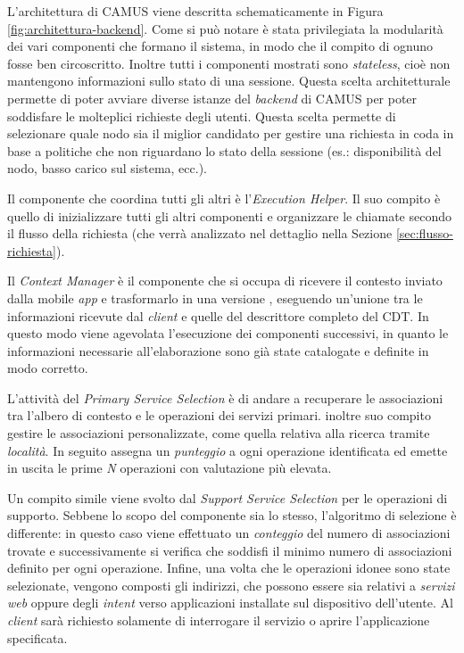 L'architettura di CAMUS viene descritta schematicamente in Figura \ref{fig:architettura-backend}. Come si può notare è stata privilegiata la modularità dei vari componenti che formano il sistema, in modo che il compito di ognuno fosse ben circoscritto. Inoltre tutti i componenti mostrati sono \emph{stateless}, cioè non mantengono informazioni sullo stato di una sessione. Questa scelta architetturale permette di poter avviare diverse istanze del \emph{backend} di CAMUS per poter soddisfare le molteplici richieste degli utenti. Questa scelta permette di selezionare quale nodo sia il miglior candidato per gestire una richiesta in coda in base a politiche che non riguardano lo stato della sessione (es.: disponibilità del nodo, basso carico sul sistema, ecc.).

Il componente che coordina tutti gli altri è l'\emph{Execution Helper}. Il suo compito è quello di inizializzare tutti gli altri componenti e organizzare le chiamate secondo il flusso della richiesta (che verrà analizzato nel dettaglio nella Sezione \ref{sec:flusso-richiesta}).

Il \emph{Context Manager} è il componente che si occupa di ricevere il contesto inviato dalla mobile \emph{app} e trasformarlo in una versione , eseguendo un'unione tra le informazioni ricevute dal \emph{client} e quelle del descrittore completo del CDT. In questo modo viene agevolata l'esecuzione dei componenti successivi, in quanto le informazioni necessarie all'elaborazione sono già state catalogate e definite in modo corretto.

L'attività del \emph{Primary Service Selection} è di andare a recuperare le associazioni tra l'albero di contesto e le operazioni dei servizi primari. \upe inoltre suo compito gestire le associazioni personalizzate, come quella relativa alla ricerca tramite \emph{località}. In seguito assegna un \emph{punteggio} a ogni operazione identificata ed emette in uscita le prime \emph{N} operazioni con valutazione più elevata.

Un compito simile viene svolto dal \emph{Support Service Selection} per le operazioni di supporto. Sebbene lo scopo del componente sia lo stesso, l'algoritmo di selezione è differente: in questo caso viene effettuato un \emph{conteggio} del numero di associazioni trovate e successivamente si verifica che soddisfi il minimo numero di associazioni definito per ogni operazione. Infine, una volta che le operazioni idonee sono state selezionate, vengono composti gli indirizzi, che possono essere sia relativi a \emph{servizi web} oppure degli \emph{intent} verso applicazioni installate sul dispositivo dell'utente. Al \emph{client} sarà richiesto solamente di interrogare il servizio o aprire l'applicazione specificata.

